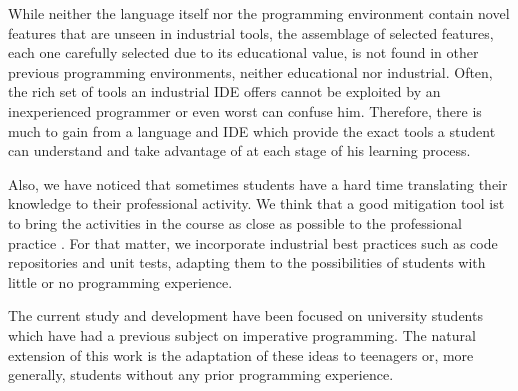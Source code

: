 \medskip

While neither the language itself nor the programming environment contain novel features that are unseen in industrial tools,
the assemblage of selected features, each one carefully selected due to its educational value,
is not found in other previous programming environments, neither educational nor industrial.
Often, the rich set of tools an industrial IDE offers cannot be exploited by an inexperienced programmer or even worst can confuse him.
Therefore, there is much to gain from a language and IDE which provide the exact tools 
a student can understand and take advantage of at each stage of his learning process.

Also, we have noticed that sometimes students
have a hard time translating their knowledge to their professional activity.
We think that a good mitigation tool ist to bring the activities in the course as close as possible to the professional practice \cite{McDermott2017AssessmentAuthenticity}.
For that matter, we incorporate industrial best practices such as code repositories and unit tests, 
adapting them to the possibilities of students with little or no programming experience.


The current study and development have been focused on university students which have had a previous subject on imperative programming.
The natural extension of this work is the adaptation of these ideas to teenagers or, more generally, students without any prior programming experience.

